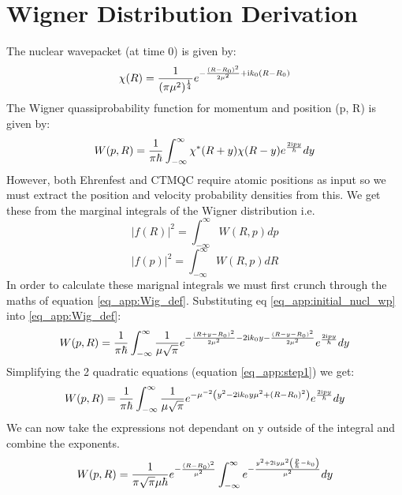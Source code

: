 \chapter{Wigner Distribution Derivation}
\label{app:Wigner}
The nuclear wavepacket (at time 0) is given by:
\begin{equation}
  \chi(R) = \frac{1}{(\pi \mu^2)^{\frac{1}{4}}} e^{-\frac{(R - R_0)^2}{2 \mu^2} + \mathrm{i} k_0 (R - R_0) }
  \label{eq_app:initial_nucl_wp}
\end{equation}
The Wigner quassiprobability function for momentum and position (p, R) is given by:
\begin{equation}
  W(p, R) = \frac{1}{\pi \hbar} \int_{-\infty}^{\infty} \chi^{*}(R + y) \chi(R -y) e^{\frac{2 \mathrm{i} p y}{\hbar}} dy
  \label{eq_app:Wig_def}
\end{equation}
However, both Ehrenfest and CTMQC require atomic positions as input so we must extract the position and velocity probability densities from this. We get these from the marginal integrals of the Wigner distribution i.e.
\begin{equation}
  \vert f(R)\vert^2 = \int^{\infty}_{-\infty} W(R, p) dp
\end{equation}
\begin{equation}
  \vert f(p)\vert^2 = \int^{\infty}_{-\infty} W(R, p) dR
\end{equation}
In order to calculate these marignal integrals we must first crunch through the maths of equation \eqref{eq_app:Wig_def}. Substituting eq \eqref{eq_app:initial_nucl_wp} into \eqref{eq_app:Wig_def}:
\begin{equation}
  W(p, R) = \frac{1}{\pi \hbar} \int_{-\infty}^{\infty} \frac{1}{\mu \sqrt{\pi}} e^{- \frac{(R + y - R_0)^2}{2 \mu^2} - 2\mathrm{i} k_0y - \frac{(R - y - R_0)^2}{2 \mu^2} } e^{\frac{2 \mathrm{i} p y}{\hbar}} dy
  \label{eq_app:step1}
\end{equation}
Simplifying the 2 quadratic equations (equation \eqref{eq_app:step1}) we get:
\begin{equation}
  W(p, R) = \frac{1}{\pi \hbar} \int_{-\infty}^{\infty} \frac{1}{\mu \sqrt{\pi}} e^{-\mu^{-2} \left(y^2 - 2\mathrm{i} k_0y \mu^2 + (R - R_0)^2 \right) } e^{\frac{2 \mathrm{i} p y}{\hbar}} dy
  \label{eq_app:step2}
\end{equation}
We can now take the expressions not dependant on y outside of the integral and combine the exponents.
\begin{equation}
  W(p, R) = \frac{1}{\pi \sqrt{\pi} \mu \hbar} e^{-\frac{(R - R_0)^2}{\mu^2}} \int_{-\infty}^{\infty} e^{-\frac{y^2 + 2 \mathrm{i} y\mu^{2}\left( \frac{p}{\hbar} - k_0\right)}{\mu^{2}}  } dy
  \label{eq_app:step3}
\end{equation}

